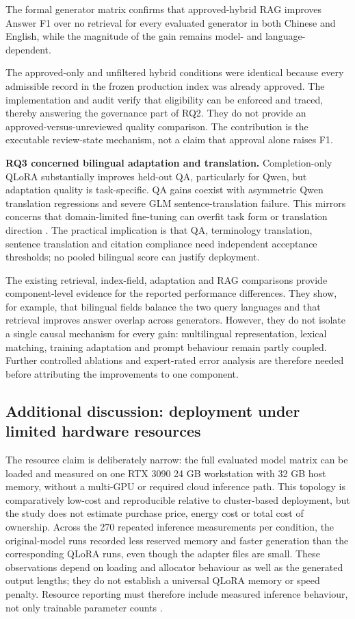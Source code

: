 The formal generator matrix confirms that approved-hybrid RAG improves Answer F1 over no retrieval for every evaluated generator in both Chinese and English, while the magnitude of the gain remains model- and language-dependent.

The approved-only and unfiltered hybrid conditions were identical because every admissible record in the frozen production index was already approved. The implementation and audit verify that eligibility can be enforced and traced, thereby answering the governance part of RQ2. They do not provide an approved-versus-unreviewed quality comparison. The contribution is the executable review-state mechanism, not a claim that approval alone raises F1.

\textbf{RQ3 concerned bilingual adaptation and translation.} Completion-only QLoRA substantially improves held-out QA, particularly for Qwen, but adaptation quality is task-specific. QA gains coexist with asymmetric Qwen translation regressions and severe GLM sentence-translation failure. This mirrors concerns that domain-limited fine-tuning can overfit task form or translation direction \citep{hu2024translation,vieira2024translation}. The practical implication is that QA, terminology translation, sentence translation and citation compliance need independent acceptance thresholds; no pooled bilingual score can justify deployment.

The existing retrieval, index-field, adaptation and RAG comparisons provide component-level evidence for the reported performance differences. They show, for example, that bilingual fields balance the two query languages and that retrieval improves answer overlap across generators. However, they do not isolate a single causal mechanism for every gain: multilingual representation, lexical matching, training adaptation and prompt behaviour remain partly coupled. Further controlled ablations and expert-rated error analysis are therefore needed before attributing the improvements to one component.

\subsection{Additional discussion: deployment under limited hardware resources}

The resource claim is deliberately narrow: the full evaluated model matrix can be loaded and measured on one RTX 3090 24 GB workstation with 32 GB host memory, without a multi-GPU or required cloud inference path. This topology is comparatively low-cost and reproducible relative to cluster-based deployment, but the study does not estimate purchase price, energy cost or total cost of ownership. Across the 270 repeated inference measurements per condition, the original-model runs recorded less reserved memory and faster generation than the corresponding QLoRA runs, even though the adapter files are small. These observations depend on loading and allocator behaviour as well as the generated output lengths; they do not establish a universal QLoRA memory or speed penalty. Resource reporting must therefore include measured inference behaviour, not only trainable parameter counts \citep{schwartz2020green,ding2023peft,lv2024full}.


